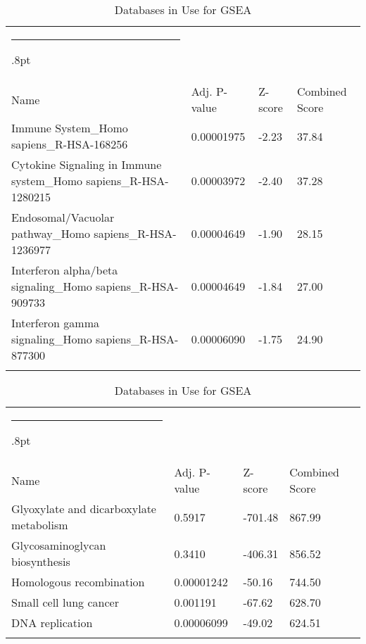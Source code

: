 \documentclass[3p,authoryear,preprint,12pt]{elsarticle}
\makeatletter
\def\hlinewd#1{%
  \noalign{\ifnum0=`}\fi\hrule \@height #1%
  \futurelet\reserved@a\@xhline}
\def\tbltoprule{\hlinewd{.8pt}\\[-12pt]}
\def\tblbottomrule{\noalign{\vspace*{6pt}}\hline\noalign{\vspace*{2pt}}}
\def\tblmidrule{\noalign{\vspace*{6pt}}\hline\noalign{\vspace*{2pt}}}
\makeatother
\begin{document}
\begin{table*}[!htbp]
	\caption{{Databases in Use for GSEA} }
	\label{tw-de478ae31cc6}
	\def\arraystretch{1}
	\ignorespaces 
	\centering 
	\begin{tabulary}{\linewidth}{p{\dimexpr.65\tabcolsep}p{\dimexpr.15\tabcolsep}p{\dimexpr.1\tabcolsep}p{\dimexpr.1\tabcolsep}}
		\tbltoprule Name & Adj. P-value & Z-score & Combined Score\\
		\tblmidrule
Immune System\_Homo sapiens\_R-HSA-168256 & 0.00001975 & -2.23 & 37.84 \\
Cytokine Signaling in Immune system\_Homo sapiens\_R-HSA-1280215 & 0.00003972 & -2.40 & 37.28 \\
Endosomal/Vacuolar pathway\_Homo sapiens\_R-HSA-1236977 & 0.00004649 & -1.90 & 28.15 \\
Interferon alpha/beta signaling\_Homo sapiens\_R-HSA-909733 & 0.00004649 & -1.84 & 27.00 \\
Interferon gamma signaling\_Homo sapiens\_R-HSA-877300 & 0.00006090 & -1.75 & 24.90 \\
		\tblbottomrule
	\end{tabulary}\par 
\end{table*}
\begin{table*}[!htbp]
	\caption{{Databases in Use for GSEA} }
	\label{tw-de478ae31cc6}
	\def\arraystretch{1}
	\ignorespaces 
	\centering 
	\begin{tabulary}{\linewidth}{p{\dimexpr.65\tabcolsep}p{\dimexpr.15\tabcolsep}p{\dimexpr.1\tabcolsep}p{\dimexpr.1\tabcolsep}}
		\tbltoprule Name & Adj. P-value & Z-score & Combined Score\\
		\tblmidrule
Glyoxylate and dicarboxylate metabolism & 0.5917 & -701.48 & 867.99 \\
Glycosaminoglycan biosynthesis & 0.3410 & -406.31 & 856.52 \\
Homologous recombination & 0.00001242 & -50.16 & 744.50 \\
Small cell lung cancer & 0.001191 & -67.62 & 628.70 \\
DNA replication & 0.00006099 & -49.02 & 624.51 \\
		\tblbottomrule
	\end{tabulary}\par 
\end{table*}
\end{document}
